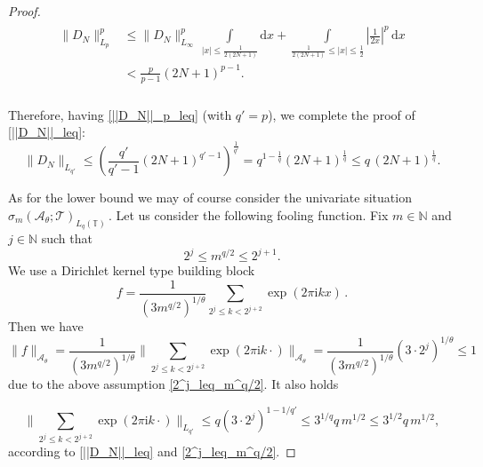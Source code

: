 \documentclass[11pt,reqno]{article}
\numberwithin{equation}{section}
\theoremstyle{definition}
\theoremstyle{plain}
\newcommand{\N}{\ensuremath{\mathbb{N}}}
\newcommand{\tor}{\ensuremath{\mathbb{T}}}
\newcommand{\ca}{\ensuremath{\mathcal A}}
\begin{document}
\begin{proof}
  \begin{align}
  \label{||D_N||_p_leq}
      \begin{split}
    \|D_N\|^{p}_{L_{p}} &  \leq \|D_N\|_{L_{\infty}}^{p}\, \int\limits_{|x|\leq \frac{1}{2(2N+1)}}  \mathrm{d}x
+  \int\limits_{\frac{1}{2(2N+1)}\leq|x|\leq\frac{1}{2}} \left|\frac{1}{2x} \right|^{p}\, \mathrm{d}x \\
& < \frac{p}{p-1} (2N+1)^{p-1} .\\
      \end{split}
  \end{align}

Therefore, having \eqref{||D_N||_p_leq} (with \(q' = p\)), we complete the proof of \eqref{||D_N||_leq}:
 $$
\|D_N\|_{L_{q'}} 
 \leq  \left(\frac{q'}{q'-1} (2N+1)^{q'-1}\right)^{\frac{1}{q'}} 
 = q^{1-\frac{1}{q}} (2N+1)^{\frac{1}{q}}
  \leq q \, (2N+1)^{\frac{1}{q}} .
 $$ 


As for the lower bound we may of course consider the univariate situation $
\sigma_{m}(\ca_\theta;\mathcal{T})_{L_q(\tor)}\,.$ Let us consider the following fooling function. Fix $m\in \N$ and $j \in \N$ such that  \begin{equation} \label{2^j_leq_m^q/2}
2^j \leq m^{q/2} \leq 2^{j+1}.
 \end{equation}
 We use a Dirichlet kernel type building block  
$$
    f = \frac{1}{(3m^{q/2})^{1/\theta}}\sum\limits_{2^j \leq k < 2^{j+2}} \exp(2\pi \mathrm{i} kx)\,.
 $$
Then we have  
 $$
 \|f\|_{\ca_\theta} 
 = \frac{1}{(3m^{q/2})^{1/\theta}} \bigg\|\sum\limits_{2^j \leq k < 2^{j+2}} \exp(2\pi \mathrm{i} k\cdot)\bigg\|_{\ca_\theta} 
 = \frac{1}{(3m^{q/2})^{1/\theta}} (3\cdot 2^j)^{1/\theta} \leq 1 
 $$
due to the above assumption  \eqref{2^j_leq_m^q/2}. 
It also holds 



 \begin{equation} \label{||D_n||_q'__leq}
 \bigg\|\sum\limits_{2^j \leq k < 2^{j+2}} \exp(2\pi \mathrm{i} k\cdot)\bigg\|_{L_{q'}}
 \leq q (3 \cdot 2^j)^{1-1/q'}
 \leq 3^{1/q} q \, m^{1/2} 
 \leq 3^{1/2} q \, m^{1/2} ,
 \end{equation}
according to \eqref{||D_N||_leq} and \eqref{2^j_leq_m^q/2}.

 

\end{proof}
\end{document}
